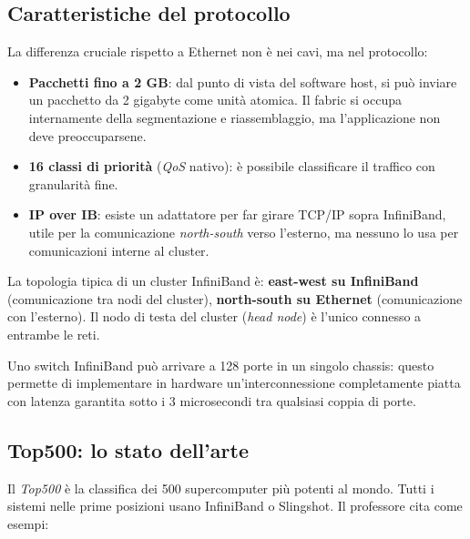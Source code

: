 \documentclass[
  italian,
  openany]{book}
\providecommand{\tightlist}{%
  \setlength{\itemsep}{0pt}\setlength{\parskip}{0pt}}
\begin{document}
\subsection{Caratteristiche del
protocollo}\label{caratteristiche-del-protocollo}

La differenza cruciale rispetto a Ethernet non è nei cavi, ma nel
protocollo:

\begin{itemize}
\tightlist
\item
  \textbf{Pacchetti fino a 2 GB}: dal punto di vista del software host,
  si può inviare un pacchetto da 2 gigabyte come unità atomica. Il
  fabric si occupa internamente della segmentazione e riassemblaggio, ma
  l'applicazione non deve preoccuparsene.
\item
  \textbf{16 classi di priorità} (\emph{QoS} nativo): è possibile
  classificare il traffico con granularità fine.
\item
  \textbf{IP over IB}: esiste un adattatore per far girare TCP/IP sopra
  InfiniBand, utile per la comunicazione \emph{north-south} verso
  l'esterno, ma nessuno lo usa per comunicazioni interne al cluster.
\end{itemize}

La topologia tipica di un cluster InfiniBand è: \textbf{east-west su
InfiniBand} (comunicazione tra nodi del cluster), \textbf{north-south su
Ethernet} (comunicazione con l'esterno). Il nodo di testa del cluster
(\emph{head node}) è l'unico connesso a entrambe le reti.

Uno switch InfiniBand può arrivare a 128 porte in un singolo chassis:
questo permette di implementare in hardware un'interconnessione
completamente piatta con latenza garantita sotto i 3 microsecondi tra
qualsiasi coppia di porte.

\subsection{Top500: lo stato dell'arte}\label{top500-lo-stato-dellarte}

Il \emph{Top500} è la classifica dei 500 supercomputer più potenti al
mondo. Tutti i sistemi nelle prime posizioni usano InfiniBand o
Slingshot. Il professore cita come esempi:
\end{document}
